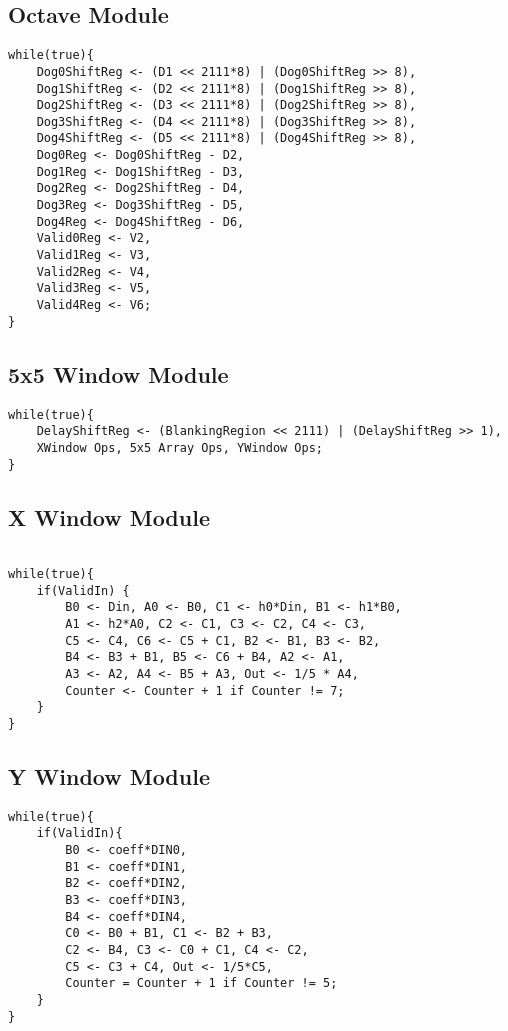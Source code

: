 \documentclass[11pt]{article}
\begin{document}
\subsection*{Octave Module}
\begin{lstlisting}
while(true){
    Dog0ShiftReg <- (D1 << 2111*8) | (Dog0ShiftReg >> 8),
    Dog1ShiftReg <- (D2 << 2111*8) | (Dog1ShiftReg >> 8),
    Dog2ShiftReg <- (D3 << 2111*8) | (Dog2ShiftReg >> 8),
    Dog3ShiftReg <- (D4 << 2111*8) | (Dog3ShiftReg >> 8),
    Dog4ShiftReg <- (D5 << 2111*8) | (Dog4ShiftReg >> 8),
    Dog0Reg <- Dog0ShiftReg - D2,
    Dog1Reg <- Dog1ShiftReg - D3,
    Dog2Reg <- Dog2ShiftReg - D4,
    Dog3Reg <- Dog3ShiftReg - D5,
    Dog4Reg <- Dog4ShiftReg - D6,
    Valid0Reg <- V2,
    Valid1Reg <- V3,
    Valid2Reg <- V4,
    Valid3Reg <- V5,
    Valid4Reg <- V6;
}
\end{lstlisting}

\subsection*{5x5 Window Module}
\begin{lstlisting}
while(true){
    DelayShiftReg <- (BlankingRegion << 2111) | (DelayShiftReg >> 1),
    XWindow Ops, 5x5 Array Ops, YWindow Ops;
}
\end{lstlisting}

\subsection*{X Window Module}
\begin{lstlisting}

while(true){
    if(ValidIn) {
        B0 <- Din, A0 <- B0, C1 <- h0*Din, B1 <- h1*B0, 
        A1 <- h2*A0, C2 <- C1, C3 <- C2, C4 <- C3, 
        C5 <- C4, C6 <- C5 + C1, B2 <- B1, B3 <- B2, 
        B4 <- B3 + B1, B5 <- C6 + B4, A2 <- A1, 
        A3 <- A2, A4 <- B5 + A3, Out <- 1/5 * A4, 
        Counter <- Counter + 1 if Counter != 7;
    }
}
\end{lstlisting}

\subsection*{Y Window Module}
\begin{lstlisting}
while(true){
    if(ValidIn){
        B0 <- coeff*DIN0, 
        B1 <- coeff*DIN1, 
        B2 <- coeff*DIN2, 
        B3 <- coeff*DIN3, 
        B4 <- coeff*DIN4, 
        C0 <- B0 + B1, C1 <- B2 + B3, 
        C2 <- B4, C3 <- C0 + C1, C4 <- C2, 
        C5 <- C3 + C4, Out <- 1/5*C5, 
        Counter = Counter + 1 if Counter != 5;
    }
}
\end{lstlisting}
\end{document}
